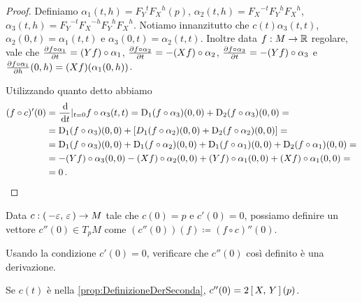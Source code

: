 \begin{proof}
	Definiamo $\alpha_1(t,h)={F_Y}^t{F_X}^h(p)$, $\alpha_2(t,h)={F_X}^{-t}{F_Y}^h{F_X}^h$, $\alpha_3(t,h)={F_Y}^{-t}{F_X}^{-h}{F_Y}^h{F_X}^h$. Notiamo innanzitutto che $c(t)\alpha_3(t,t)$, $\alpha_2(0,t)=\alpha_1(t,t)$ e $\alpha_3(0,t)=\alpha_2(t,t)$.
	Inoltre data $f:M\to\mathbb R$ regolare, vale che  
	$\frac{\partial f\circ\alpha_1}{\partial t}=(Yf)\circ\alpha_1$, $\frac{\partial f\circ \alpha_2}{\partial t} = -(Xf)\circ \alpha_2$, $\frac{\partial f\circ\alpha_3}{\partial t}=-(Yf)\circ\alpha_3$ e $\frac{\partial f\circ\alpha_1}{\partial h}(0,h)=(Xf)(\alpha_1(0,h))$.
	
	Utilizzando quanto detto abbiamo
	\begin{align*} 
	(f\circ c)'(0)&=\frac{\,\mathrm d}{\,\mathrm d t}|_{t=0}f\circ\alpha_3(t,t) =\mathrm D_1(f\circ \alpha_3)(0,0)+\mathrm D_2(f\circ\alpha_3)(0,0) =
	\\ &=\mathrm D_1(f\circ\alpha_3)(0,0)+\left[D_1(f\circ\alpha_2)(0,0)+\mathrm D_2(f\circ\alpha_2)(0,0) \right] =
	\\ &=\mathrm D_1(f\circ\alpha_3)(0,0)+\mathrm D_1(f\circ\alpha_2)(0,0)+\mathrm D_1(f\circ\alpha_1)(0,0)+\mathrm D_2(f\circ\alpha_1)(0,0) =
	\\ &=-(Yf)\circ\alpha_3(0,0)-(Xf)\circ\alpha_2(0,0)+(Yf)\circ\alpha_1(0,0)+(Xf)\circ\alpha_1(0,0) =
	\\ &=0 \, \text{. }
	\end{align*}
\end{proof}

\begin{proposition} \label{prop:DefinizioneDerSeconda}
	Data $c:\left(\,-\varepsilon,\,\varepsilon\,\right)\to M$ tale che $c(0)=p$ e $c'(0)=0$, possiamo definire un vettore $c''(0)\in T_pM$ come $(c''(0))(f)\coloneqq(f\circ c)''(0)$.
\end{proposition}

\begin{exercise}
	Usando la condizione $c'(0)=0$, verificare che $c''(0)$  così definito è una derivazione.
\end{exercise}

\begin{theorem}
	Se $c(t)$ è nella \cref{prop:DefinizioneDerSeconda}, $c''(0)=2\left[\,X,\,Y\,\right](p)$.
\end{theorem}

